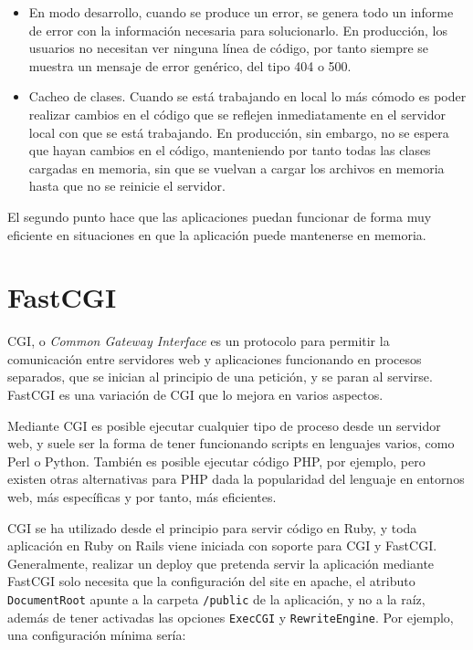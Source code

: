 \begin{itemize}
  \item En modo desarrollo, cuando se produce un error, se genera todo un informe de error con la información necesaria para solucionarlo. En producción, los usuarios no necesitan ver ninguna línea de código, por tanto siempre se muestra un mensaje de error genérico, del tipo 404 o 500.
  \item Cacheo de clases. Cuando se está trabajando en local lo más cómodo es poder realizar cambios en el código que se reflejen inmediatamente en el servidor local con que se está trabajando. En producción, sin embargo, no se espera que hayan cambios en el código, manteniendo por tanto todas las clases cargadas en memoria, sin que se vuelvan a cargar los archivos en memoria hasta que no se reinicie el servidor.
\end{itemize}

El segundo punto hace que las aplicaciones puedan funcionar de forma muy eficiente en situaciones en que la aplicación puede mantenerse en memoria.


\section{FastCGI} %
\label{sub:fastcgi}

CGI, o \emph{Common Gateway Interface} es un protocolo para permitir la comunicación entre servidores web y aplicaciones funcionando en procesos separados, que se inician al principio de una petición, y se paran al servirse. FastCGI es una variación de CGI que lo mejora en varios aspectos.

Mediante CGI es posible ejecutar cualquier tipo de proceso desde un servidor web, y suele ser la forma de tener funcionando scripts en lenguajes varios, como Perl o Python. También es posible ejecutar código PHP, por ejemplo, pero existen otras alternativas para PHP dada la popularidad del lenguaje en entornos web, más específicas y por tanto, más eficientes.

CGI se ha utilizado desde el principio para servir código en Ruby, y toda aplicación en Ruby on Rails viene iniciada con soporte para CGI y FastCGI. Generalmente, realizar un deploy que pretenda servir la aplicación mediante FastCGI solo necesita que la configuración del site en apache, el atributo \texttt{DocumentRoot} apunte a la carpeta \texttt{/public} de la aplicación, y no a la raíz, además de tener activadas las opciones \texttt{ExecCGI} y \texttt{RewriteEngine}. Por ejemplo, una configuración mínima sería:

